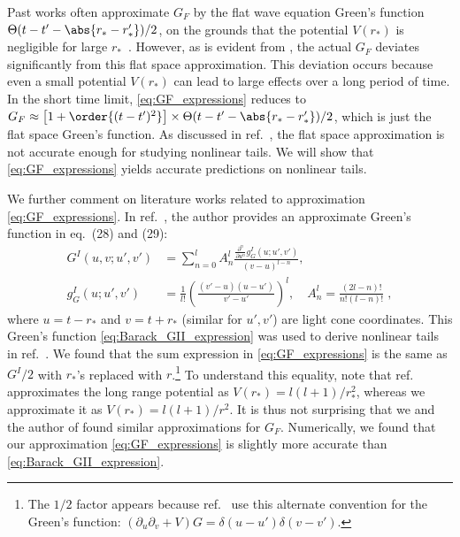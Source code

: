 Past works often approximate $G_F$ by the flat wave equation Green's function $ \Theta(t-t'-\abs{r_*-r_*'}) / 2$, on the grounds that the potential $V(r_*)$ is negligible for large $r_*$~\cite{Lagos:2022otp,Okuzumi:2008ej}.
However, as is evident from , the actual $G_F$ deviates significantly from this flat space approximation.
This deviation occurs because even a small potential $V(r_*)$ can lead to large effects over a long period of time.
In the short time limit, \eqref{eq:GF_expressions} reduces to $G_F \approx \left[1 + \order{(t-t')^2}\right] \times \Theta(t-t'-\abs{r_*-r_*'}) / 2$, which is just the flat space Green's function.
As discussed in ref.~\cite{Cardoso:2024jme}, the flat space approximation is not accurate enough for studying nonlinear tails.
We will show that \eqref{eq:GF_expressions} yields accurate predictions on nonlinear tails.



We further comment on literature works related to approximation \eqref{eq:GF_expressions}.
In ref.~\cite{Barack:1998bw}, the author provides an approximate Green's function in eq.~(28) and (29):
\begin{align}
  \label{eq:Barack_GII_expression}
  G^{I}(u,v; u', v') &= \sum_{n=0}^{l} A_n^l \frac{\frac{\partial^n}{\partial u^n} g_G^{I} (u; u', v')}{(v - u)^{l-n}}, \nonumber \\
  g_G^{I} (u; u', v') &= \frac{1}{l!} \left( \frac{(v' - u)(u - u')}{v' - u'} \right)^l, \quad A_n^l = \frac{(2l - n)!}{n!(l - n)!} \;,
\end{align}
where $u = t - r_*$ and $v = t + r_*$ (similar for $u',v'$) are light cone coordinates.
This Green's function \eqref{eq:Barack_GII_expression} was used to derive nonlinear tails in ref.~\cite{Cardoso:2024jme}.
We found that the sum expression in \eqref{eq:GF_expressions} is the same as $G^{I} / 2$ with $r_*$'s replaced with $r$.\footnote{The $1/2$ factor appears because ref.~\cite{Barack:1998bw} use this alternate convention for the Green's function: $(\partial_u \partial_v + V) G = \delta(u-u') \delta(v-v')$.}
To understand this equality, note that ref.~\cite{Barack:1998bw} approximates the long range potential as $V(r_*) = l(l+1) / r_*^2$, whereas we approximate it as $V(r_*) = l(l+1) / r^2$.
It is thus not surprising that we and the author of \cite{Barack:1998bw} found similar approximations for $G_F$.
Numerically, we found that our approximation \eqref{eq:GF_expressions} is slightly more accurate than \eqref{eq:Barack_GII_expression}.




